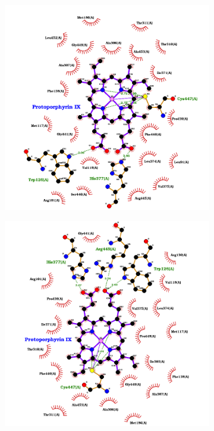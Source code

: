 \documentclass[12pt]{article}
\begin{document}
	\FloatBarrier
	\begin{figure}[H]
		\centering
		\begin{subfigure}[H]{0.35\textwidth}
			\hspace{2cm}
			\includegraphics[width=\textwidth]{../2/Dock/best.png}
			\caption{}
		\end{subfigure}
		\hfill
		\begin{subfigure}[H]{0.35\textwidth}
			\hspace{-2cm}
			\includegraphics[width=\textwidth]{../2/Dock/best2.png}

\end{subfigure}
\end{figure}
\end{document}
